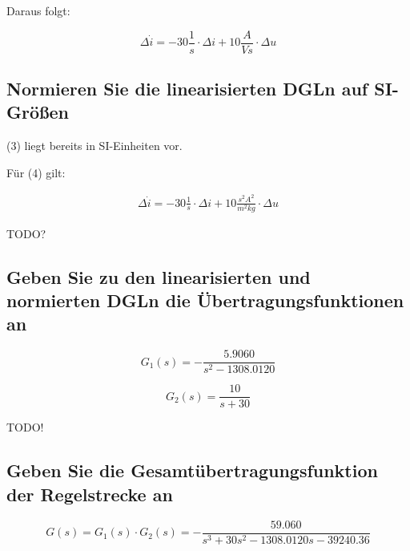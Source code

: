 \documentclass[a4paper,10pt,left=1.5cm,right=1.5cm,top=1.5cm,bottom=1.5cm]{article}
\begin{document}
Daraus folgt:

\begin{equation}
  \Delta \dot{i} = -30 \frac{1}{s} \cdot \Delta i + 10 \frac{A}{Vs} \cdot \Delta u
\end{equation}

\subsection{Normieren Sie die linearisierten DGLn auf SI-Größen}

(3) liegt bereits in SI-Einheiten vor.

Für (4) gilt:

\begin{eqnarray}
  \Delta \dot{i} = -30 \frac{1}{s} \cdot \Delta i + 10 \frac{s^2 A^2}{m^2 kg} \cdot \Delta u
\end{eqnarray}

TODO?

\subsection{Geben Sie zu den linearisierten und normierten DGLn die Übertragungsfunktionen an}

\begin{equation}
  G_1(s) = - \frac{5.9060}{s^2 - 1308.0120}
\end{equation}

\begin{equation}
  G_2(s) = \frac{10}{s+30}
\end{equation}

TODO!

\subsection{Geben Sie die Gesamtübertragungsfunktion der Regelstrecke an}

\begin{equation}
  G(s) = G_1(s) \cdot G_2(s) = - \frac{59.060}{s^3 + 30 s^2 - 1308.0120 s - 39240.36}
\end{equation}
\end{document}
